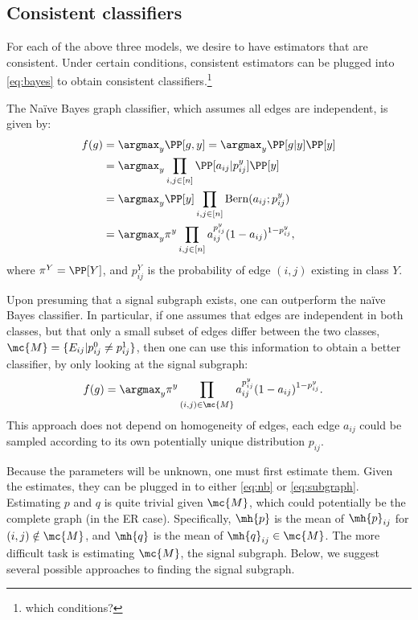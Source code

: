 

\subsection{Consistent classifiers} %
\label{sub:model_based_consistent_classifiers}


For each of the above three models, we desire to have estimators that are consistent.  Under certain conditions, consistent estimators can be plugged into \eqref{eq:bayes} to obtain consistent classifiers.\footnote{which conditions?}  

The Na\"{i}ve Bayes graph classifier, which assumes all edges are independent, is given by:
\begin{align} \label{eq:nb}
	f(g) &= \argmax_y \PP[g,y] = \argmax_y \PP[g|y] \PP[y] 
	\nonumber \\&= \argmax_y \prod_{i,j\in[n]} \PP[a_{ij} | p_{ij}^y] \PP[y]
	\nonumber \\&= \argmax_y \PP[y] \prod_{i,j\in[n]} \text{Bern}(a_{ij}; p_{ij}^y) 
	\nonumber \\&= \argmax_y \pi^y \prod_{i,j\in[n]} a_{ij}^{p_{ij}^y} (1-a_{ij})^{1-p_{ij}^y}, 
\end{align}
where $\pi^Y=\PP[Y]$, and  $p_{ij}^Y$ is the probability of edge $(i,j)$ existing in class $Y$.  

Upon presuming that a signal subgraph exists, one can outperform the na\"{i}ve Bayes classifier.  In particular, if one assumes that edges are independent in both classes, but that only a small subset of edges differ between the two classes, $\mc{M}=\{E_{ij} | p_{ij}^0 \neq p_{ij}^1\}$, then one can use this information to obtain a better classifier, by only looking at the signal subgraph:
\begin{align} \label{eq:subgraph}
	f(g) &= \argmax_y \pi^y \prod_{(i,j) \in \mc{M}} a_{ij}^{p_{ij}^y} (1-a_{ij})^{1-p_{ij}^y}.
\end{align}
This approach does not depend on homogeneity of edges, each edge $a_{ij}$ could be sampled according to its own potentially unique distribution $p_{ij}$.  

Because the parameters will be unknown, one must first estimate them.  Given the estimates, they can be plugged in to either \eqref{eq:nb} or \eqref{eq:subgraph}.  Estimating $p$ and $q$ is quite trivial given $\mc{M}$, which could potentially be the complete graph (in the ER case).  Specifically, $\mh{p}$ is the mean of $\mh{p}_{ij}$ for $(i,j) \notin \mc{M}$, and $\mh{q}$ is the mean of $\mh{q}_{ij} \in \mc{M}$.  The more difficult task is estimating $\mc{M}$, the signal subgraph.  Below, we suggest several possible approaches to finding the signal subgraph.

